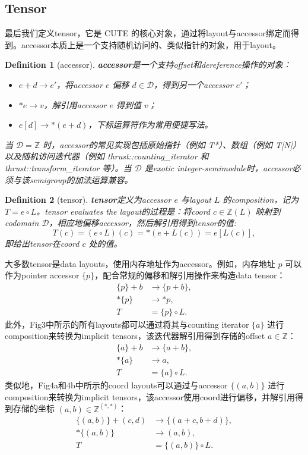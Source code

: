 \documentclass{article}
\newtheorem{definition}{Definition}[section]
\begin{document}
\subsection{Tensor}
最后我们定义tensor，它是 CUTE 的核心对象，通过将layout与accessor绑定而得到。accessor本质上是一个支持随机访问的、类似指针的对象，用于layout。
\begin{definition}[accessor]
\textbf{accessor}是一个支持offset和dereference操作的对象：
\begin{itemize}
\item \(e + d \to e'\)，将accessor \(e\) 偏移 \(d \in \mathcal{D}\)，得到另一个accessor \(e'\)；
\item \(\ast e \to v\)，解引用accessor \(e\) 得到值 \(v\)；
\item \(e[d] \to \ast(e + d)\)，下标运算符作为常用便捷写法。
\end{itemize}
当 \(\mathcal{D} = \mathbb{Z}\) 时，accessor的常见实现包括原始指针（例如 T*）、数组（例如 T[N]）以及随机访问迭代器（例如 thrust::counting\_iterator 和 thrust::transform\_iterator 等）。当 \(\mathcal{D}\) 是exotic integer-semimodule时，accessor必须与该semigroup的加法运算兼容。
\end{definition}
\begin{definition}[tensor]
\textbf{tensor}定义为accessor \(e\) 与layout \(L\) 的composition，记为 \(T = e \circ L\)。tensor evaluates the layout的过程是：将coord \(c \in \mathbb{Z}(L)\) 映射到codomain \(\mathcal{D}\)，相应地偏移accessor，然后解引用得到tensor的值:
\[
T(c) = (e \circ L)(c) = \ast(e + L(c)) = e[L(c)], \tag{9}
\]
即给出tensor在coord \(c\) 处的值。
\end{definition}
大多数tensor是data layouts，使用内存地址作为accessor。例如，内存地址 \(p\) 可以作为pointer accessor \(\{p\}\)，配合常规的偏移和解引用操作来构造data tensor：
\begin{align*}
\{p\} + b &\to \{p + b\},\\
\ast\{p\} &\to \ast p,\\
T &= \{p\} \circ L.
\end{align*}
此外，Fig3中所示的所有layouts都可以通过将其与counting iterator \(\{a\}\) 进行composition来转换为implicit tensors，该迭代器解引用得到存储的offset \(a \in \mathbb{Z}\)：
\begin{align*}
\{a\} + b &\to \{a + b\},\\
\ast\{a\} &\to a,\\
T &= \{a\} \circ L.
\end{align*}
类似地，Fig4a和4b中所示的coord layouts可以通过与accessor \(\{(a, b)\}\) 进行composition来转换为implicit tensors，该accessor使用coord进行偏移，并解引用得到存储的坐标 \((a, b) \in \mathbb{Z}^{(\ast, \ast)}\)：
\begin{align*}
\{(a, b)\} + (c, d) &\to \{(a + c, b + d)\},\\
\ast\{(a, b)\} &\to (a, b),\\
T &= \{(a, b)\} \circ L.
\end{align*}
\end{document}
